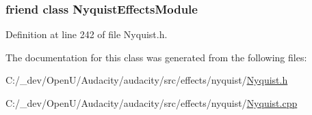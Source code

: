 \subsubsection[{\texorpdfstring{Nyquist\+Effects\+Module}{NyquistEffectsModule}}]{\setlength{\rightskip}{0pt plus 5cm}friend class {\bf Nyquist\+Effects\+Module}\hspace{0.3cm}{\ttfamily [friend]}}\hypertarget{class_nyquist_effect_ae73d30c6cc4238cda7356741047e7574}{}\label{class_nyquist_effect_ae73d30c6cc4238cda7356741047e7574}


Definition at line 242 of file Nyquist.\+h.



The documentation for this class was generated from the following files\+:\begin{DoxyCompactItemize}
\item 
C\+:/\+\_\+dev/\+Open\+U/\+Audacity/audacity/src/effects/nyquist/\hyperlink{_nyquist_8h}{Nyquist.\+h}\item 
C\+:/\+\_\+dev/\+Open\+U/\+Audacity/audacity/src/effects/nyquist/\hyperlink{_nyquist_8cpp}{Nyquist.\+cpp}\end{DoxyCompactItemize}
